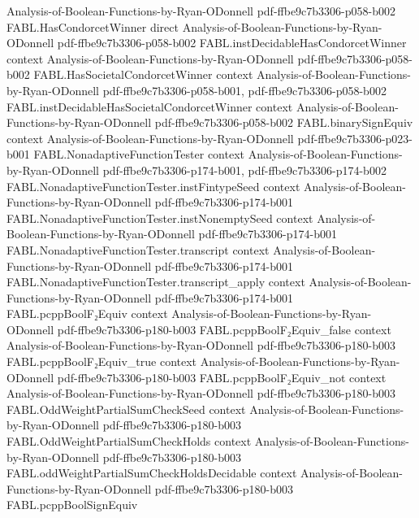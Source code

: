 \begin{theorem}
  {Analysis-of-Boolean-Functions-by-Ryan-ODonnell}
  {pdf-ffbe9c7b3306-p058-b002}
\proofstep
  {FABL.HasCondorcetWinner}
  {direct}
  {Analysis-of-Boolean-Functions-by-Ryan-ODonnell}
  {pdf-ffbe9c7b3306-p058-b002}
\proofstep
  {FABL.instDecidableHasCondorcetWinner}
  {context}
  {Analysis-of-Boolean-Functions-by-Ryan-ODonnell}
  {pdf-ffbe9c7b3306-p058-b002}
\proofstep
  {FABL.HasSocietalCondorcetWinner}
  {context}
  {Analysis-of-Boolean-Functions-by-Ryan-ODonnell}
  {pdf-ffbe9c7b3306-p058-b001,
    pdf-ffbe9c7b3306-p058-b002}
\proofstep
  {FABL.instDecidableHasSocietalCondorcetWinner}
  {context}
  {Analysis-of-Boolean-Functions-by-Ryan-ODonnell}
  {pdf-ffbe9c7b3306-p058-b002}
\proofstep
  {FABL.binarySignEquiv}
  {context}
  {Analysis-of-Boolean-Functions-by-Ryan-ODonnell}
  {pdf-ffbe9c7b3306-p023-b001}
\proofstep
  {FABL.NonadaptiveFunctionTester}
  {context}
  {Analysis-of-Boolean-Functions-by-Ryan-ODonnell}
  {pdf-ffbe9c7b3306-p174-b001,
    pdf-ffbe9c7b3306-p174-b002}
\proofstep
  {FABL.NonadaptiveFunctionTester.instFintypeSeed}
  {context}
  {Analysis-of-Boolean-Functions-by-Ryan-ODonnell}
  {pdf-ffbe9c7b3306-p174-b001}
\proofstep
  {FABL.NonadaptiveFunctionTester.instNonemptySeed}
  {context}
  {Analysis-of-Boolean-Functions-by-Ryan-ODonnell}
  {pdf-ffbe9c7b3306-p174-b001}
\proofstep
  {FABL.NonadaptiveFunctionTester.transcript}
  {context}
  {Analysis-of-Boolean-Functions-by-Ryan-ODonnell}
  {pdf-ffbe9c7b3306-p174-b001}
\proofstep
  {FABL.NonadaptiveFunctionTester.transcript_apply}
  {context}
  {Analysis-of-Boolean-Functions-by-Ryan-ODonnell}
  {pdf-ffbe9c7b3306-p174-b001}
\proofstep
  {FABL.pcppBoolF₂Equiv}
  {context}
  {Analysis-of-Boolean-Functions-by-Ryan-ODonnell}
  {pdf-ffbe9c7b3306-p180-b003}
\proofstep
  {FABL.pcppBoolF₂Equiv_false}
  {context}
  {Analysis-of-Boolean-Functions-by-Ryan-ODonnell}
  {pdf-ffbe9c7b3306-p180-b003}
\proofstep
  {FABL.pcppBoolF₂Equiv_true}
  {context}
  {Analysis-of-Boolean-Functions-by-Ryan-ODonnell}
  {pdf-ffbe9c7b3306-p180-b003}
\proofstep
  {FABL.pcppBoolF₂Equiv_not}
  {context}
  {Analysis-of-Boolean-Functions-by-Ryan-ODonnell}
  {pdf-ffbe9c7b3306-p180-b003}
\proofstep
  {FABL.OddWeightPartialSumCheckSeed}
  {context}
  {Analysis-of-Boolean-Functions-by-Ryan-ODonnell}
  {pdf-ffbe9c7b3306-p180-b003}
\proofstep
  {FABL.OddWeightPartialSumCheckHolds}
  {context}
  {Analysis-of-Boolean-Functions-by-Ryan-ODonnell}
  {pdf-ffbe9c7b3306-p180-b003}
\proofstep
  {FABL.oddWeightPartialSumCheckHoldsDecidable}
  {context}
  {Analysis-of-Boolean-Functions-by-Ryan-ODonnell}
  {pdf-ffbe9c7b3306-p180-b003}
\proofstep
  {FABL.pcppBoolSignEquiv}

\end{theorem}
